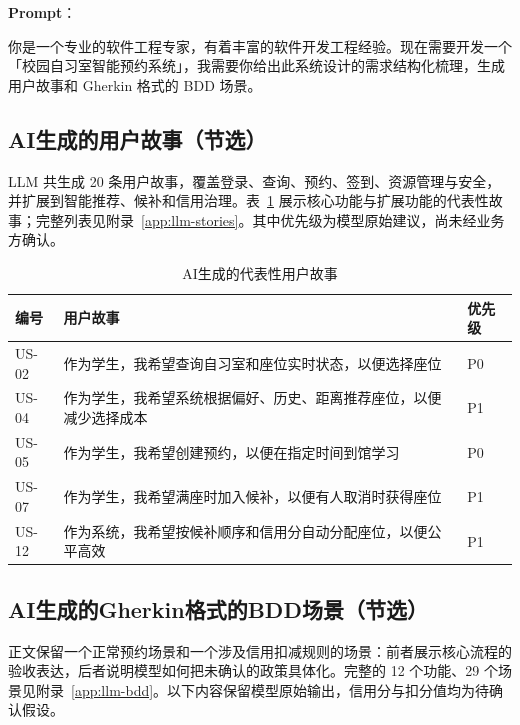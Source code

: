 \documentclass[11pt,a4paper]{article}
\begin{document}
\noindent\textbf{Prompt}：

\begin{framed}
\noindent 你是一个专业的软件工程专家，有着丰富的软件开发工程经验。现在需要开发一个「校园自习室智能预约系统」，我需要你给出此系统设计的需求结构化梳理，生成用户故事和 Gherkin 格式的 BDD 场景。
\end{framed}

\subsection{AI生成的用户故事（节选）}
LLM 共生成 20 条用户故事，覆盖登录、查询、预约、签到、资源管理与安全，并扩展到智能推荐、候补和信用治理。表~\ref{tab:llm-story-sample} 展示核心功能与扩展功能的代表性故事；完整列表见附录~\ref{app:llm-stories}。其中优先级为模型原始建议，尚未经业务方确认。

\begin{longtable}{@{}p{}p{}p{}@{}}
    \caption{AI生成的代表性用户故事}\label{tab:llm-story-sample} \\
    \toprule
    \textbf{编号} & \textbf{用户故事} & \textbf{优先级} \\
    \midrule
        US-02 & 作为学生，我希望查询自习室和座位实时状态，以便选择座位 & P0 \\
        \midrule
        US-04 & 作为学生，我希望系统根据偏好、历史、距离推荐座位，以便减少选择成本 & P1 \\
        \midrule
        US-05 & 作为学生，我希望创建预约，以便在指定时间到馆学习 & P0 \\
        \midrule
        US-07 & 作为学生，我希望满座时加入候补，以便有人取消时获得座位 & P1 \\
        \midrule
        US-12 & 作为系统，我希望按候补顺序和信用分自动分配座位，以便公平高效 & P1 \\
    \bottomrule
\end{longtable}

\newpage
\subsection{AI生成的Gherkin格式的BDD场景（节选）}
正文保留一个正常预约场景和一个涉及信用扣减规则的场景：前者展示核心流程的验收表达，后者说明模型如何把未确认的政策具体化。完整的 12 个功能、29 个场景见附录~\ref{app:llm-bdd}。以下内容保留模型原始输出，信用分与扣分值均为待确认假设。
\end{document}
